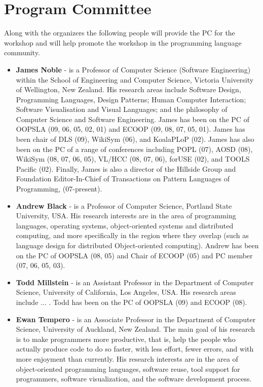 \documentclass{acm_proc_article-sp}
\begin{document}
\section{Program Committee}

Along with the organizers the following people will provide the PC for the workshop and will help 
promote the workshop in the programming language community. 

\begin{itemize}
\item \textbf{James Noble} - is a Professor of Computer Science (Software Engineering) within the School of 
Engineering and Computer Science, Victoria University of Wellington, New Zealand. 
His research areas include Software Design, Programming Languages, Design Patterns; 
Human Computer Interaction; Software Visualisation and Visual Languages; and the philosophy of Computer Science and Software Engineering. James has been on the PC of OOPSLA (09, 06, 05, 02, 01) and ECOOP (09, 08, 07,  05, 01). James has been chair of DLS (09), WikiSym (06), and KoalaPLoP (02). James has also been on the PC of a range of conferences including POPL (07), AOSD (08), WikiSym (08, 07, 06, 05), VL/HCC (08, 07, 06), forUSE (02), and TOOLS Pacific (02). Finally, James is also a director of the Hillside Group and Foundation Editor-In-Chief of Transactions on Pattern Languages of Programming, (07-present).

\item \textbf{Andrew Black} - is a Professor of Computer Science, Portland State University, USA. His research interests are in the area of programming languages, operating systems, object-oriented systems and distributed computing, and more specifically in the region where they overlap (such as language design for distributed Object-oriented computing). Andrew has been on the PC of OOPSLA (08, 05) and Chair of ECOOP (05) and PC member (07, 06, 05, 03).

\item \textbf{Todd Millstein} - is an Assistant Professor in the Department of Computer Science, University of California, Los Angeles, USA. His research areas include ... . Todd has been on the PC of OOPSLA (09) and ECOOP (08).

\item \textbf{Ewan Tempero} - is an Associate Professor in the Department of Computer Science, University of Auckland, New Zealand. The main goal of his research is to make programmers more productive, that is, help the people who actually produce code to do so faster, with less effort, fewer errors, and with more enjoyment than currently. His research interests are in the area of object-oriented programming languages, software reuse, tool support for programmers, software visualization, and the software development process.


\end{itemize}
\end{document}
